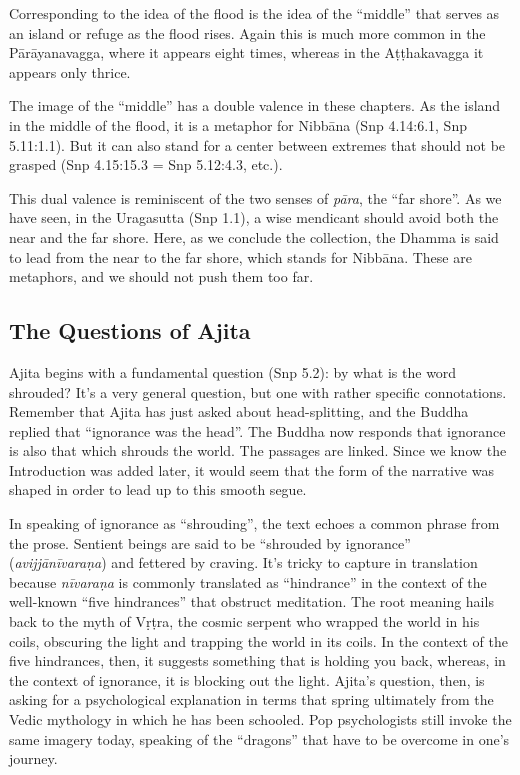 \documentclass[12pt,openany]{book}%
\begin{document}
Corresponding to the idea of the flood is the idea of the “middle” that serves as an island or refuge as the flood rises. Again this is much more common in the \textsanskrit{Pārāyanavagga}, where it appears eight times, whereas in the \textsanskrit{Aṭṭhakavagga} it appears only thrice.

The image of the “middle” has a double valence in these chapters. As the island in the middle of the flood, it is a metaphor for \textsanskrit{Nibbāna} (Snp 4.14:6.1, Snp 5.11:1.1). But it can also stand for a center between extremes that should not be grasped (Snp 4.15:15.3 = Snp 5.12:4.3, etc.).

This dual valence is reminiscent of the two senses of \textit{\textsanskrit{pāra}}, the “far shore”. As we have seen, in the Uragasutta (Snp 1.1), a wise mendicant should avoid both the near and the far shore. Here, as we conclude the collection, the Dhamma is said to lead from the near to the far shore, which stands for \textsanskrit{Nibbāna}. These are metaphors, and we should not push them too far.

\subsection*{The Questions of Ajita}

Ajita begins with a fundamental question (Snp 5.2): by what is the word shrouded? It’s a very general question, but one with rather specific connotations. Remember that Ajita has just asked about head-splitting, and the Buddha replied that “ignorance was the head”. The Buddha now responds that ignorance is also that which shrouds the world. The passages are linked. Since we know the Introduction was added later, it would seem that the form of the narrative was shaped in order to lead up to this smooth segue.

In speaking of ignorance as “shrouding”, the text echoes a common phrase from the prose. Sentient beings are said to be “shrouded by ignorance” (\textit{\textsanskrit{avijjānīvaraṇa}}) and fettered by craving. It’s tricky to capture in translation because \textit{\textsanskrit{nīvaraṇa}} is commonly translated as “hindrance” in the context of the well-known “five hindrances” that obstruct meditation. The root meaning hails back to the myth of \textsanskrit{Vṛṭra}, the cosmic serpent who wrapped the world in his coils, obscuring the light and trapping the world in its coils. In the context of the five hindrances, then, it suggests something that is holding you back, whereas, in the context of ignorance, it is blocking out the light. Ajita’s question, then, is asking for a psychological explanation in terms that spring ultimately from the Vedic mythology in which he has been schooled. Pop psychologists still invoke the same imagery today, speaking of the “dragons” that have to be overcome in one’s journey.
\end{document}
